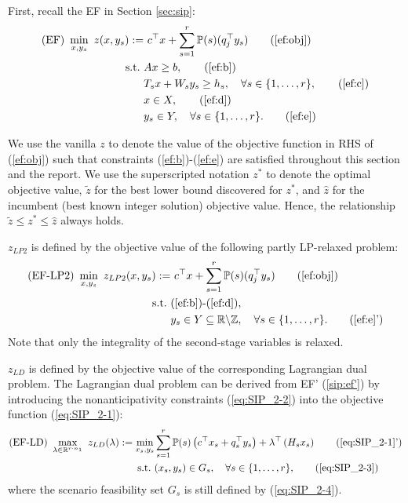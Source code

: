 First, recall the EF in Section \ref{sec:sip}:
\begin{subequations}\label{ef}
	\begin{align}
	\textrm{(EF) }\min_{x,y_s}\ z(x,y_s):=&\ c^{\top}x + \sum_{s=1}^{r}\PP(s) (q_j^{\top}y_s) \tag{\ref{ef:obj}}\\ 
	\mathrm{s.t.}\ &Ax\ge b,  \tag{\ref{ef:b}}\\
	&T_s x+W_s y_s\ge h_s,\quad\forall s\in\{1,\ldots,r\}, \tag{\ref{ef:c}} \\
	&x\in X, \tag{\ref{ef:d}} \\
	&y_s \in Y,\quad\forall s\in\{1,\ldots,r\}. \tag{\ref{ef:e}}
	\end{align}
\end{subequations}

We use the vanilla $z$ to denote the value of the objective function in RHS of (\ref{ef:obj}) such that constraints (\ref{ef:b})-(\ref{ef:e}) are satisfied throughout this section and the report. We use the superscripted notation $z^*$ to denote the optimal objective value, $\tilde{z}$ for the best lower bound discovered for $z^*$, and $\hat{z}$ for the incumbent (best known integer solution) objective value. Hence, the relationship $\tilde{z}\le z^*\le\hat{z}$ always holds.

$z_{LP2}$ is defined by the objective value of the following partly LP-relaxed problem:
\begin{subequations}\label{ef-lp2}
	\begin{align}
	\textrm{(EF-LP2) }\min_{x,y_s}\ z_{LP2}(x,y_s):=&\ c^{\top}x + \sum_{s=1}^{r}\PP(s) (q_j^{\top}y_s) \tag{\ref{ef:obj}}\\ 
	\mathrm{s.t.}\ &\textrm{(\ref{ef:b})-(\ref{ef:d})}, \nonumber \\
	& y_s \in Y \subseteq \mathbb{R}\backslash\mathbb{Z} ,\quad\forall s\in\{1,\ldots,r\}. \tag{\ref{ef:e}'}
	\end{align}
\end{subequations}
Note that only the integrality of the second-stage variables is relaxed.

$z_{LD}$ is defined by the objective value of the corresponding Lagrangian dual problem. The Lagrangian dual problem can be derived from EF' (\ref{sip:ef'}) by introducing the nonanticipativity constraints (\ref{eq:SIP_2-2}) into the objective function (\ref{eq:SIP_2-1}):
\begin{subequations}\label{ef-ld}
	\begin{align}
	\textrm{(EF-LD) }\max_{\lambda\in\mathbb{R}^{r\cdot n_1}}\ z_{LD}(\lambda) :=\min_{x_s,y_s} &\sum_{s=1}^{r}\PP(s)\left(c^{\top}x_s+q_s^{\top}y_s\right)+\lambda^\top \left(H_s x_s\right)	\tag{\ref{eq:SIP_2-1}'}\\ 
	\mathrm{s.t.}\ & (x_s,y_s)\in G_s,\quad \forall s\in\{1,\ldots,r\},	\tag{\ref{eq:SIP_2-3}}
	\end{align}
\end{subequations}
where the scenario feasibility set $G_s$ is still defined by (\ref{eq:SIP_2-4}).


